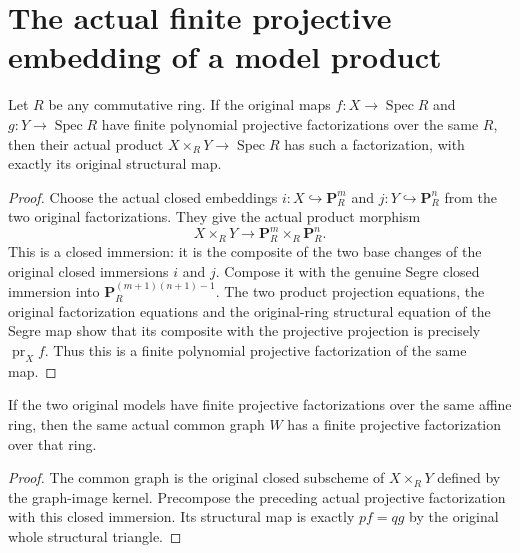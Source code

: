 \section{The actual finite projective embedding of a model product}
\label{sec:projective-factorization-products}

\begin{lemma}
\label{lem:projective-factorization-products}
\leanok
Let $R$ be any commutative ring. If the original maps
$f:X\to\operatorname{Spec}R$ and
$g:Y\to\operatorname{Spec}R$ have finite polynomial
projective factorizations over the same $R$, then their
actual product $X\times_RY\to\operatorname{Spec}R$ has
such a factorization, with exactly its original structural map.
\end{lemma}

\begin{proof}
Choose the actual closed embeddings
$i:X\hookrightarrow\mathbf P^m_R$ and
$j:Y\hookrightarrow\mathbf P^n_R$ from the two original
factorizations. They give the actual product morphism
\[
 X\times_RY\longrightarrow\mathbf P^m_R\times_R\mathbf P^n_R.
\]
This is a closed immersion: it is the composite of the two
base changes of the original closed immersions $i$ and $j$.
Compose it with the genuine Segre closed immersion into
$\mathbf P^{(m+1)(n+1)-1}_R$. The two product projection
equations, the original factorization equations and the
original-ring structural equation of the Segre map show
that its composite with the projective projection is
precisely $\operatorname{pr}_Xf$. Thus this is a finite
polynomial projective factorization of the same map.
\end{proof}

\begin{corollary}
\label{cor:common-proper-model-projective}
\leanok
{}
If the two original models have finite projective factorizations
over the same affine ring, then the same actual common graph
$W$ has a finite projective factorization over that ring.
\end{corollary}

\begin{proof}
The common graph is the original closed subscheme of
$X\times_RY$ defined by the graph-image kernel. Precompose
the preceding actual projective factorization with this
closed immersion. Its structural map is exactly $pf=qg$
by the original whole structural triangle.
\end{proof}
